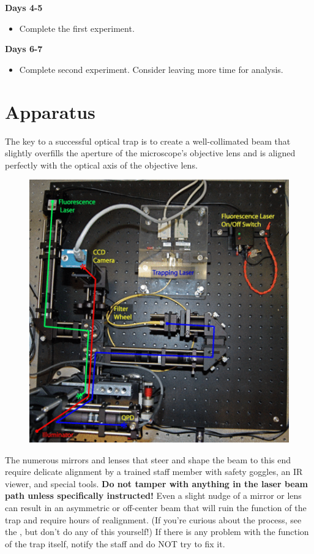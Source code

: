 \documentclass{../lab}
\begin{document}
\textbf{Days 4-5}

\begin{itemize}
    \item Complete the first experiment.

\end{itemize}

\textbf{Days 6-7}

\begin{itemize}
    \item Complete second experiment. Consider leaving more time for analysis.

\end{itemize}

\section{Apparatus}

The key to a successful optical trap is to create a well-collimated beam that slightly overfills the aperture of the microscope's objective lens and is aligned perfectly with the optical axis of the objective lens.


\begin{figure}[h]
    \centering
    \href{http://experimentationlab.berkeley.edu/sites/default/files/images/450px-OTZ_From_Above.gif}{\includegraphics[width=0.5\linewidth]{images/450px-OTZ_From_Above.png}}
    \caption{}
    \label{fig:450px-OTZ_From_Above}
\end{figure}

The numerous mirrors and lenses that steer and shape the beam to this end require delicate alignment by a trained staff member with safety goggles, an IR viewer, and special tools. \textbf{Do not tamper with anything in the laser beam path unless specifically instructed!} Even a slight nudge of a mirror or lens can result in an asymmetric or off-center beam that will ruin the function of the trap and require hours of realignment. (If you're curious about the process, see the \textbf{}, but don't do any of this yourself!) If there is any problem with the function of the trap itself, notify the staff and do NOT try to fix it.
\end{document}
